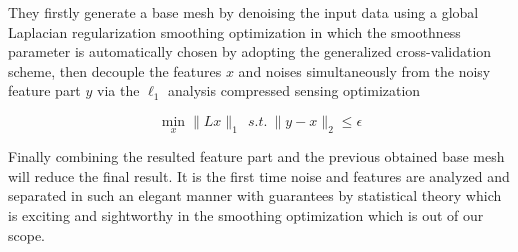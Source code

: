 They firstly generate a base mesh by denoising the input data using a global Laplacian regularization smoothing optimization in which the smoothness parameter is automatically chosen by adopting the generalized cross-validation scheme,
then decouple the features $x$ and noises simultaneously from the noisy feature part $y$ via the $\ell_1$ analysis compressed sensing optimization

\small{
\begin{equation}
 \label{eq:edgecotanoperator}
 \min_{x}\|Lx\|_1~~ s.t. ~ \|y-x\|_2 \le \epsilon
\end{equation}
}

Finally combining the resulted feature part and the previous obtained base mesh will reduce the final result. It is the first time noise and features are analyzed and separated in such an elegant manner with guarantees by statistical theory which is exciting and sightworthy in the smoothing optimization which is out of our scope. %